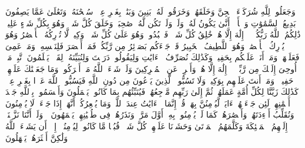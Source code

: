 \stopbuffer
\startbuffer[\q:6:100]
وَجَعَلُوا۟ لِلَّهِ شُرَكَاۤءَ ٱلۡجِنَّ وَخَلَقَهُمۡۖ وَخَرَقُوا۟ لَهُۥ بَنِینَ وَبَنَٰتِۭ بِغَیۡرِ عِلۡمࣲۚ سُبۡحَٰنَهُۥ وَتَعَٰلَىٰ عَمَّا یَصِفُونَ%
\stopbuffer
\startbuffer[\q:6:101]
بَدِیعُ ٱلسَّمَٰوَٰتِ وَٱلۡأَرۡضِۖ أَنَّىٰ یَكُونُ لَهُۥ وَلَدࣱ وَلَمۡ تَكُن لَّهُۥ صَٰحِبَةࣱۖ وَخَلَقَ كُلَّ شَیۡءࣲۖ وَهُوَ بِكُلِّ شَیۡءٍ عَلِیمࣱ%
\stopbuffer
\startbuffer[\q:6:102]
ذَٰلِكُمُ ٱللَّهُ رَبُّكُمۡۖ لَاۤ إِلَٰهَ إِلَّا هُوَۖ خَٰلِقُ كُلِّ شَیۡءࣲ فَٱعۡبُدُوهُۚ وَهُوَ عَلَىٰ كُلِّ شَیۡءࣲ وَكِیلࣱ%
\stopbuffer
\startbuffer[\q:6:103]
لَّا تُدۡرِكُهُ ٱلۡأَبۡصَٰرُ وَهُوَ یُدۡرِكُ ٱلۡأَبۡصَٰرَۖ وَهُوَ ٱللَّطِیفُ ٱلۡخَبِیرُ%
\stopbuffer
\startbuffer[\q:6:104]
قَدۡ جَاۤءَكُم بَصَاۤئِرُ مِن رَّبِّكُمۡۖ فَمَنۡ أَبۡصَرَ فَلِنَفۡسِهِۦۖ وَمَنۡ عَمِیَ فَعَلَیۡهَاۚ وَمَاۤ أَنَا۠ عَلَیۡكُم بِحَفِیظࣲ%
\stopbuffer
\startbuffer[\q:6:105]
وَكَذَٰلِكَ نُصَرِّفُ ٱلۡءَایَٰتِ وَلِیَقُولُوا۟ دَرَسۡتَ وَلِنُبَیِّنَهُۥ لِقَوۡمࣲ یَعۡلَمُونَ%
\stopbuffer
\startbuffer[\q:6:106]
ٱتَّبِعۡ مَاۤ أُوحِیَ إِلَیۡكَ مِن رَّبِّكَۖ لَاۤ إِلَٰهَ إِلَّا هُوَۖ وَأَعۡرِضۡ عَنِ ٱلۡمُشۡرِكِینَ%
\stopbuffer
\startbuffer[\q:6:107]
وَلَوۡ شَاۤءَ ٱللَّهُ مَاۤ أَشۡرَكُوا۟ۗ وَمَا جَعَلۡنَٰكَ عَلَیۡهِمۡ حَفِیظࣰاۖ وَمَاۤ أَنتَ عَلَیۡهِم بِوَكِیلࣲ%
\stopbuffer
\startbuffer[\q:6:108]
وَلَا تَسُبُّوا۟ ٱلَّذِینَ یَدۡعُونَ مِن دُونِ ٱللَّهِ فَیَسُبُّوا۟ ٱللَّهَ عَدۡوَۢا بِغَیۡرِ عِلۡمࣲۗ كَذَٰلِكَ زَیَّنَّا لِكُلِّ أُمَّةٍ عَمَلَهُمۡ ثُمَّ إِلَىٰ رَبِّهِم مَّرۡجِعُهُمۡ فَیُنَبِّئُهُم بِمَا كَانُوا۟ یَعۡمَلُونَ%
\stopbuffer
\startbuffer[\q:6:109]
وَأَقۡسَمُوا۟ بِٱللَّهِ جَهۡدَ أَیۡمَٰنِهِمۡ لَئِن جَاۤءَتۡهُمۡ ءَایَةࣱ لَّیُؤۡمِنُنَّ بِهَاۚ قُلۡ إِنَّمَا ٱلۡءَایَٰتُ عِندَ ٱللَّهِۖ وَمَا یُشۡعِرُكُمۡ أَنَّهَاۤ إِذَا جَاۤءَتۡ لَا یُؤۡمِنُونَ%
\stopbuffer
\startbuffer[\q:6:110]
وَنُقَلِّبُ أَفۡءِدَتَهُمۡ وَأَبۡصَٰرَهُمۡ كَمَا لَمۡ یُؤۡمِنُوا۟ بِهِۦۤ أَوَّلَ مَرَّةࣲ وَنَذَرُهُمۡ فِی طُغۡیَٰنِهِمۡ یَعۡمَهُونَ%
\stopbuffer
\startbuffer[\q:6:111]
۞ وَلَوۡ أَنَّنَا نَزَّلۡنَاۤ إِلَیۡهِمُ ٱلۡمَلَٰۤئِكَةَ وَكَلَّمَهُمُ ٱلۡمَوۡتَىٰ وَحَشَرۡنَا عَلَیۡهِمۡ كُلَّ شَیۡءࣲ قُبُلࣰا مَّا كَانُوا۟ لِیُؤۡمِنُوۤا۟ إِلَّاۤ أَن یَشَاۤءَ ٱللَّهُ وَلَٰكِنَّ أَكۡثَرَهُمۡ یَجۡهَلُونَ%
\stopbuffer
